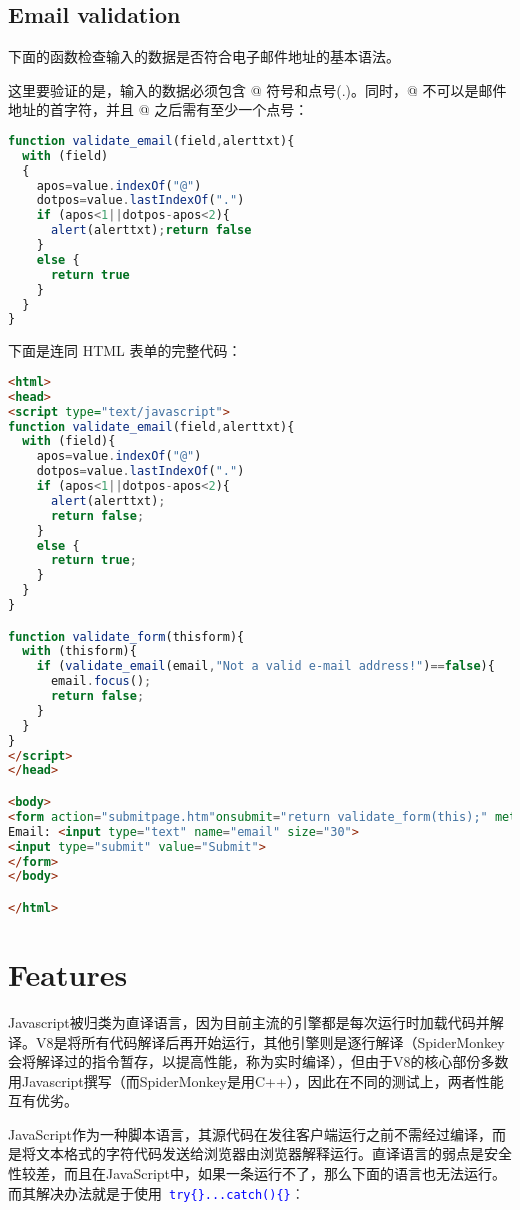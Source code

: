 \section{Email validation}


下面的函数检查输入的数据是否符合电子邮件地址的基本语法。

这里要验证的是，输入的数据必须包含 @ 符号和点号(.)。同时，@ 不可以是邮件地址的首字符，并且 @ 之后需有至少一个点号：

\begin{lstlisting}[language=JavaScript]
function validate_email(field,alerttxt){
  with (field)
  {
    apos=value.indexOf("@")
    dotpos=value.lastIndexOf(".")
    if (apos<1||dotpos-apos<2){
      alert(alerttxt);return false
    }
    else {
      return true
    }
  }
}
\end{lstlisting}

下面是连同 HTML 表单的完整代码：

\begin{lstlisting}[language=HTML]
<html>
<head>
<script type="text/javascript">
function validate_email(field,alerttxt){
  with (field){
    apos=value.indexOf("@")
    dotpos=value.lastIndexOf(".")
    if (apos<1||dotpos-apos<2){
      alert(alerttxt); 
      return false;
    }
    else {
      return true;
    }
  }
}

function validate_form(thisform){
  with (thisform){
    if (validate_email(email,"Not a valid e-mail address!")==false){
      email.focus();
      return false;
    }
  }
}
</script>
</head>

<body>
<form action="submitpage.htm"onsubmit="return validate_form(this);" method="post">
Email: <input type="text" name="email" size="30">
<input type="submit" value="Submit"> 
</form>
</body>

</html>
\end{lstlisting}

\chapter{Features}

Javascript被归类为直译语言，因为目前主流的引擎都是每次运行时加载代码并解译。V8是将所有代码解译后再开始运行，其他引擎则是逐行解译（SpiderMonkey会将解译过的指令暂存，以提高性能，称为实时编译），但由于V8的核心部份多数用Javascript撰写（而SpiderMonkey是用C++），因此在不同的测试上，两者性能互有优劣。

JavaScript作为一种脚本语言，其源代码在发往客户端运行之前不需经过编译，而是将文本格式的字符代码发送给浏览器由浏览器解释运行。直译语言的弱点是安全性较差，而且在JavaScript中，如果一条运行不了，那么下面的语言也无法运行。而其解决办法就是于使用~\textcolor{Blue}{\texttt{try\{\}...catch()\{\}}}︰


